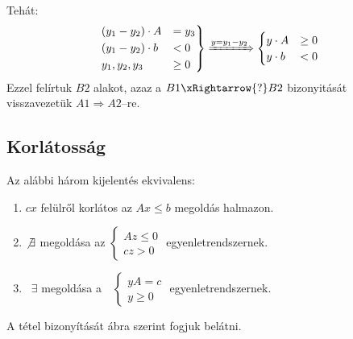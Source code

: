 Tehát:
\[
\begin{rcases}
(y_1 - y_2) \cdot A &= y_3 \\ 
(y_1 - y_2) \cdot b &< 0 \\
y_1, y_2, y_3 &\geq 0
\end{rcases} \xRightarrow{y=y_1-y_2} 
\begin{cases}
y \cdot A &\geq 0 \\ 
y \cdot b &< 0
\end{cases}
\]
Ezzel felírtuk $B2$ alakot, azaz a $B1\xRightarrow{?}B2$ bizonyitását
visszavezetük $A1 \Rightarrow A2$--re.

\subsection{Korlátosság}

Az alábbi három kijelentés ekvivalens:

\begin{enumerate}
  \item $cx$ felülről korlátos az $Ax \leq b$ megoldás halmazon.
  \item $\not \exists$ megoldása az $ \begin{cases}
  Az \leq 0 \\
  cz > 0
  \end{cases} $ egyenletrendszernek.
  \item ~$\exists$ megoldása a~~$\begin{cases}
  yA=c \\
  y \geq 0
  \end{cases}$ egyenletrendszernek.
\end{enumerate}

A tétel bizonyítását  ábra szerint fogjuk belátni.
 
